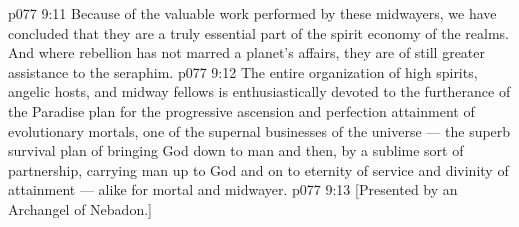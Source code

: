 \vs p077 9:11 Because of the valuable work performed by these midwayers, we have concluded that they are a truly essential part of the spirit economy of the realms. And where rebellion has not marred a planet’s affairs, they are of still greater assistance to the seraphim.
\vs p077 9:12 \pc The entire organization of high spirits, angelic hosts, and midway fellows is enthusiastically devoted to the furtherance of the Paradise plan for the progressive ascension and perfection attainment of evolutionary mortals, one of the supernal businesses of the universe --- the superb survival plan of bringing God down to man and then, by a sublime sort of partnership, carrying man up to God and on to eternity of service and divinity of attainment --- alike for mortal and midwayer.
\vsetoff
\vs p077 9:13 [Presented by an Archangel of Nebadon.]
\quizlink
